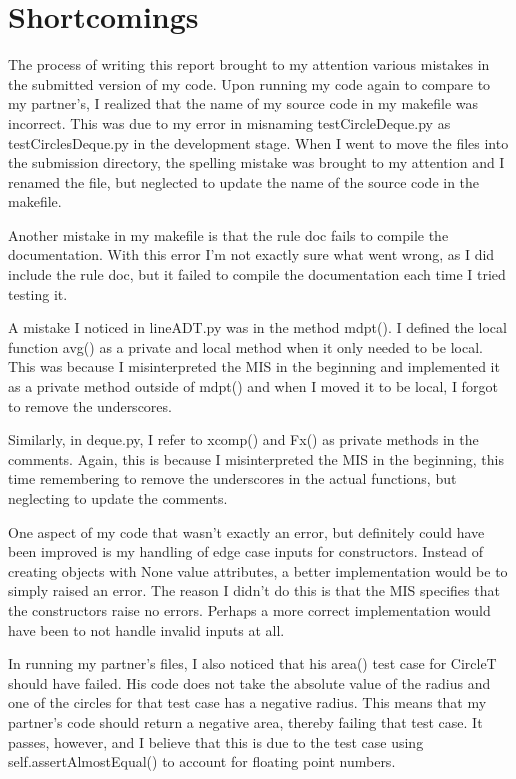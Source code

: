 \documentclass{article}
\begin{document}
\section{Shortcomings}
{ 
\indent \indent The process of writing this report brought to my attention various mistakes in the submitted version of my code. Upon running my code again to compare to my partner's, I realized that the name of my source code in my makefile was incorrect. This was due to my error in misnaming testCircleDeque.py as testCirclesDeque.py in the development stage. When I went to move the files into the submission directory, the spelling mistake was brought to my attention and I renamed the file, but neglected to update the name of the source code in the makefile. 

\indent Another mistake in my makefile is that the rule doc fails to compile the documentation. With this error I'm not exactly sure what went wrong, as I did include the rule doc, but it failed to compile the documentation each time I tried testing it.

\indent A mistake I noticed in lineADT.py was in the method mdpt(). I defined the local function avg() as a private and local method when it only needed to be local. This was because I misinterpreted the MIS in the beginning and implemented it as a private method outside of mdpt() and when I moved it to be local, I forgot to remove the underscores.

\indent Similarly, in deque.py, I refer to xcomp() and Fx() as private methods in the comments. Again, this is because I misinterpreted the MIS in the beginning, this time remembering to remove the underscores in the actual functions, but neglecting to update the comments.

\indent One aspect of my code that wasn't exactly an error, but definitely could have been improved is my handling of edge case inputs for constructors. Instead of creating objects with None value attributes, a better implementation would be to simply raised an error. The reason I didn't do this is that the MIS specifies that the constructors raise no errors. Perhaps a more correct implementation would have been to not handle invalid inputs at all.

\indent In running my partner's files, I also noticed that his area() test case for CircleT should have failed. His code does not take the absolute value of the radius and one of the circles for that test case has a negative radius. This means that my partner's code should return a negative area, thereby failing that test case. It passes, however, and I believe that this is due to the test case using self.assertAlmostEqual() to account for floating point numbers.

}
\end{document}
